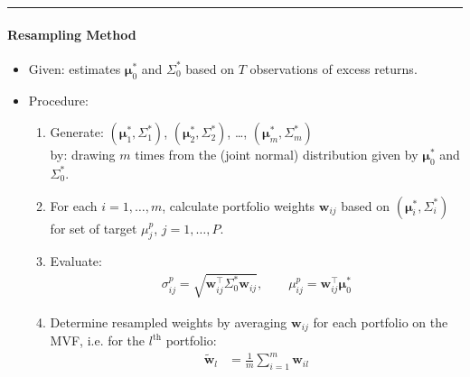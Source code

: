 \documentclass[a4paper,landscape,8pt,fleqn]{scrartcl}
\begin{document}
\begin{multicols*}{3}
\rule{\columnwidth}{0.4pt}

\paragraph{Resampling Method}
\begin{itemize}
\item Given: estimates $\bm \mu_0^\ast$ and $\Sigma_0^\ast$ based on $T$ observations of excess returns.
\item Procedure:
\begin{enumerate}
\item Generate: $(\bm \mu_1^\ast, \Sigma_1^\ast)$, $(\bm \mu_2^\ast, \Sigma_2^\ast)$, \ldots, $(\bm \mu_m^\ast, \Sigma_m^\ast)$ \\
by: drawing $m$ times from the (joint normal) distribution given by $\bm \mu_0^\ast$ and $\Sigma_0^\ast$.
\item For each $i=1, \ldots, m$, calculate portfolio weights $\bm w_{ij}$ based on $(\bm \mu_i^\ast, \Sigma_i^\ast)$ for set of target $\mu_j^p$, $j = 1, \ldots, P$.
\item Evaluate:
\begin{align*}
\sigma_{ij}^p = \sqrt{\bm w_{ij}^\top \Sigma_0^\ast \bm w_{ij}}, \qquad
\mu_{ij}^p = \bm w_{ij}^\top \bm \mu_0^\ast
\end{align*}
\item Determine resampled weights by averaging $\bm w_{ij}$ for each portfolio on the MVF, i.e. for the $l^\text{th}$ portfolio:
\begin{align*}
\tilde {\bm w}_l &= \frac{1}{m} \sum_{i=1}^m \bm w_{il}
\end{align*}
\end{enumerate}
\end{itemize}


\end{multicols*}
\end{document}
